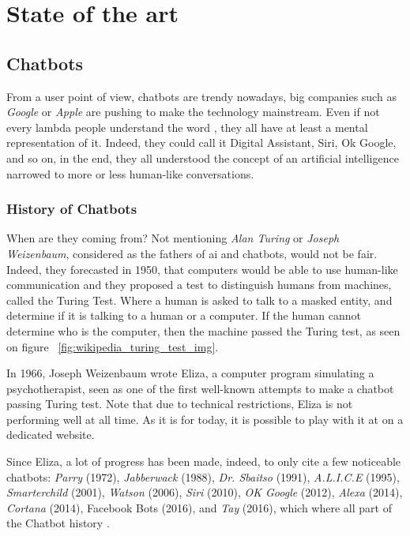 \chapter{State of the art}
\label{chap:state-of-the-art}

\section{Chatbots}
From a user point of view, chatbots are trendy nowadays, big companies such as \textit{Google} or \textit{Apple} are pushing to make the technology mainstream. Even if not every lambda people understand the word , they all have at least a mental representation of it. Indeed, they could call it Digital Assistant, Siri, Ok Google, and so on, in the end, they all understood the concept of an artificial intelligence narrowed to more or less human-like conversations.

\subsection{History of Chatbots}
When are they coming from? Not mentioning \textit{Alan Turing} or \textit{Joseph Weizenbaum}, considered as the fathers of \gls{ai} and chatbots, would not be fair. Indeed, they forecasted in 1950, that computers would be able to use human-like communication and they proposed a test to distinguish humans from machines, called the Turing Test\cite{paper:turing}. Where a human is asked to talk to a masked entity, and determine if it is talking to a human or a computer. If the human cannot determine who is the computer, then the machine passed the Turing test, as seen on figure ~\ref{fig:wikipedia_turing_test_img}. 

In 1966, Joseph Weizenbaum wrote Eliza, a computer program simulating a psychotherapist, seen as one of the first well-known attempts to make a chatbot passing Turing test. Note that due to technical restrictions, Eliza is not performing well at all time. As it is for today, it is possible to play with it at on a dedicated website. \cite{chatbot:eliza}

Since Eliza, a lot of progress has been made, indeed, to only cite a few noticeable chatbots: \textit{Parry}\cite{chatbot:parry} (1972), \textit{Jabberwack}\cite{chatbot:jabberwack} (1988), \textit{Dr. Sbaitso}\cite{chatbot:dr-sbaitso} (1991), \textit{A.L.I.C.E}\cite{chatbot:alice} (1995), \textit{Smarterchild}\cite{chatbot:smarterchild} (2001), \textit{Watson}\cite{chatbot:watson} (2006), \textit{Siri}\cite{chatbot:siri} (2010), \textit{OK Google}\cite{chatbot:google} (2012), \textit{Alexa}\cite{chatbot:alexa} (2014), \textit{Cortana}\cite{chatbot:cortana} (2014), Facebook Bots\cite{chatbot:facebook} (2016), and \textit{Tay}\cite{chatbot:tay} (2016), which where all part of the Chatbot history \cite{chatbot:futurism_history_infography}.

